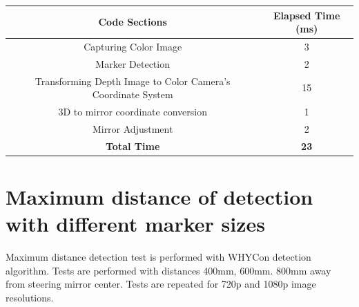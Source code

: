 \begin{table}[ht]
    \centering
    \begin{tabular}{| c | c |} %
        \hline Code Sections                                         & Elapsed Time (ms) \\ \hline %
        Capturing Color Image                                        & 3                 \\
        Marker Detection                                             & 2                 \\
        Transforming Depth Image to Color Camera's Coordinate System & 15                \\
        3D to mirror coordinate conversion                           & 1                 \\
        Mirror Adjustment                                            & 2                 \\
        \textbf{Total Time}                                          & \textbf{23}       \\
        \hline
    \end{tabular}
    \label{tab:code_runtime}
\end{table}


\section{Maximum distance of detection with different marker sizes}

Maximum distance detection test is performed with WHYCon
detection algorithm. Tests are performed with distances 400mm,
600mm. 800mm away from steering mirror center. Tests are repeated
for 720p and 1080p image resolutions.


